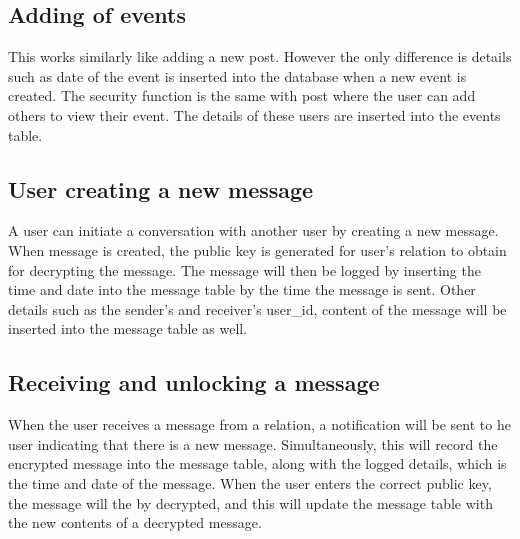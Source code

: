 \subsection{Adding of events}
This works similarly like adding a new post. However the only difference is
details such as date of the event is inserted into the database when a new event
is created. The security function is the same with post where the user can add
others to view their event. The details of these users are inserted into the
events table. 

\subsection{User creating a new message}
A user can initiate a conversation with another user by creating a new message.
When message is created, the public key is generated for user's relation to
obtain for decrypting the message. The message will then be logged by inserting
the time and date into the message table by the time the message is sent. Other
details such as the sender's and receiver's user\_id, content of the message
will be inserted into the message table as well. 

\subsection{Receiving and unlocking a message}
When the user receives a message from a relation, a notification will be sent to 
he user indicating that there is a new message. Simultaneously, this will record
the encrypted message into the message table, along with the logged details,
which is the time and date of the message. When the user enters the correct
public key, the message will the by decrypted, and this will update the message
table with the new contents of a decrypted message. 
